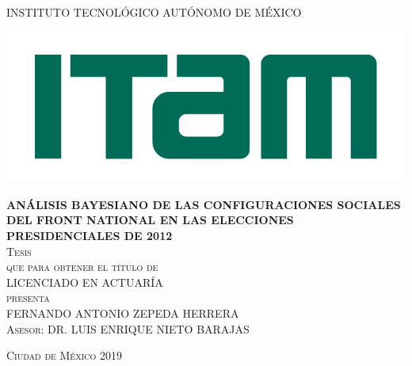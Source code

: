 \begin{titlepage}

\begin{center}

\large{INSTITUTO TECNOLÓGICO AUTÓNOMO DE MÉXICO}\\

\begin{center}
	\includegraphics[scale=0.8]{Figs/logo-ITAM.pdf}
\end{center}

\textsc{\large \textbf{ANÁLISIS BAYESIANO DE LAS CONFIGURACIONES SOCIALES DEL FRONT NATIONAL EN LAS ELECCIONES PRESIDENCIALES DE 2012}}\\[2em]

\textsc{\large Tesis}\\[1em]

\textsc{que para obtener el título de}\\[1em]

\textsc{LICENCIADO EN ACTUARÍA}\\[1em]

\textsc{presenta}\\[1em]

\textsc{\Large FERNANDO ANTONIO ZEPEDA HERRERA}\\[1em]

\textsc{\large Asesor: DR. LUIS ENRIQUE NIETO BARAJAS}

\end{center}

\vspace*{\fill}
\textsc{Ciudad de México \hspace*{\fill} 2019}

\end{titlepage}